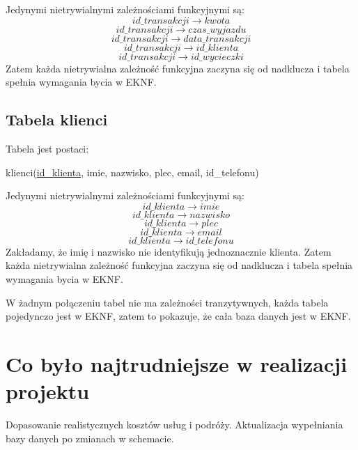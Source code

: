 \documentclass[a4paper,12pt]{mwart}
\begin{document}
\noindent Jedynymi nietrywialnymi zależnościami funkcyjnymi są:
$$   id\_transakcji\rightarrow kwota $$
$$   id\_transakcji\rightarrow czas\_wyjazdu$$
$$   id\_transakcji\rightarrow data\_transakcji $$
$$   id\_transakcji\rightarrow id\_klienta $$
$$   id\_transakcji\rightarrow id\_wycieczki $$
Zatem każda nietrywialna zależność funkcyjna zaczyna się od nadklucza i tabela  spełnia wymagania bycia w EKNF.

\subsection{Tabela klienci}
Tabela jest postaci:

klienci(\underline{id\_klienta}, imie, nazwisko, plec, email, id\_telefonu)

\noindent Jedynymi nietrywialnymi zależnościami funkcyjnymi są:
$$   id\_klienta\rightarrow imie $$
$$   id\_klienta\rightarrow nazwisko$$
$$   id\_klienta\rightarrow plec$$
$$   id\_klienta\rightarrow email $$
$$   id\_klienta\rightarrow id\_telefonu $$
Zakładamy, że imię i nazwisko nie identyfikują jednoznacznie klienta.
Zatem każda nietrywialna zależność funkcyjna zaczyna się od nadklucza i tabela  spełnia wymagania bycia w EKNF.



W żadnym połączeniu tabel nie ma zależności tranzytywnych, każda tabela pojedynczo jest w EKNF, zatem to pokazuje, że cała baza danych jest w EKNF.

\section{Co było najtrudniejsze w realizacji projektu}

\begin{outline}
    \1 Dopasowanie realistycznych kosztów usług i podróży.
    \1 Aktualizacja wypełniania bazy danych po zmianach w schemacie.
\end{outline}
\end{document}
